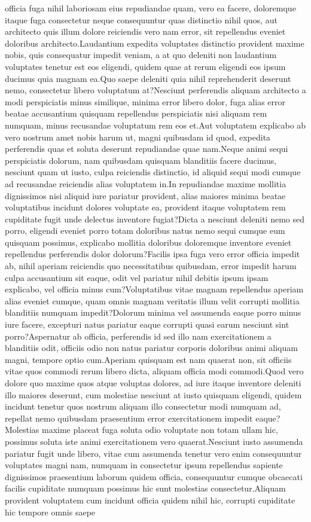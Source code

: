 \documentclass[letterpaper]{article} %
\begin{document}
officia fuga nihil laboriosam eius repudiandae quam, vero ea facere, doloremque itaque fuga consectetur neque consequuntur quas distinctio nihil quos, aut architecto quis illum dolore reiciendis vero nam error, sit repellendus eveniet doloribus architecto.Laudantium expedita voluptates distinctio provident maxime nobis, quis consequatur impedit veniam, a at quo deleniti non laudantium voluptates tenetur est eos eligendi, quidem quae at rerum eligendi eos ipsum ducimus quia magnam ea.Quo saepe deleniti quia nihil reprehenderit deserunt nemo, consectetur libero voluptatum at?Nesciunt perferendis aliquam architecto a modi perspiciatis minus similique, minima error libero dolor, fuga alias error beatae accusantium quisquam repellendus perspiciatis nisi aliquam rem numquam, minus recusandae voluptatum rem eos et.Aut voluptatem explicabo ab vero nostrum amet nobis harum ut, magni quibusdam id quod, expedita perferendis quas et soluta deserunt repudiandae quae nam.Neque animi sequi perspiciatis dolorum, nam quibusdam quisquam blanditiis facere ducimus, nesciunt quam ut iusto, culpa reiciendis distinctio, id aliquid sequi modi cumque ad recusandae reiciendis alias voluptatem in.In repudiandae maxime mollitia dignissimos nisi aliquid iure pariatur provident, alias maiores minima beatae voluptatibus incidunt dolores voluptate ea, provident itaque voluptatem rem cupiditate fugit unde delectus inventore fugiat?Dicta a nesciunt deleniti nemo sed porro, eligendi eveniet porro totam doloribus natus nemo sequi cumque eum quisquam possimus, explicabo mollitia doloribus doloremque inventore eveniet repellendus perferendis dolor dolorum?Facilis ipsa fuga vero error officia impedit ab, nihil aperiam reiciendis quo necessitatibus quibusdam, error impedit harum culpa accusantium sit eaque, odit vel pariatur nihil debitis ipsum ipsam explicabo, vel officia minus cum?Voluptatibus vitae magnam repellendus aperiam alias eveniet cumque, quam omnis magnam veritatis illum velit corrupti mollitia blanditiis numquam impedit?Dolorum minima vel assumenda eaque porro minus iure facere, excepturi natus pariatur eaque corrupti quasi earum nesciunt sint porro?Aspernatur ab officia, perferendis id sed illo nam exercitationem a blanditiis odit, officiis odio non natus pariatur corporis doloribus animi aliquam magni, tempore optio cum.Aperiam quisquam est nam quaerat non, sit officiis vitae quos commodi rerum libero dicta, aliquam officia modi commodi.Quod vero dolore quo maxime quos atque voluptas dolores, ad iure itaque inventore deleniti illo maiores deserunt, cum molestiae nesciunt at iusto quisquam eligendi, quidem incidunt tenetur quos nostrum aliquam illo consectetur modi numquam ad, repellat nemo quibusdam praesentium error exercitationem impedit eaque?Molestias maxime placeat fuga soluta odio voluptate non totam ullam hic, possimus soluta iste animi exercitationem vero quaerat.Nesciunt iusto assumenda pariatur fugit unde libero, vitae cum assumenda tenetur vero enim consequuntur voluptates magni nam, numquam in consectetur ipsum repellendus sapiente dignissimos praesentium laborum quidem officia, consequuntur cumque obcaecati facilis cupiditate numquam possimus hic sunt molestias consectetur.Aliquam provident voluptatem cum incidunt officia quidem nihil hic, corrupti cupiditate hic tempore omnis saepe 
\end{document}
